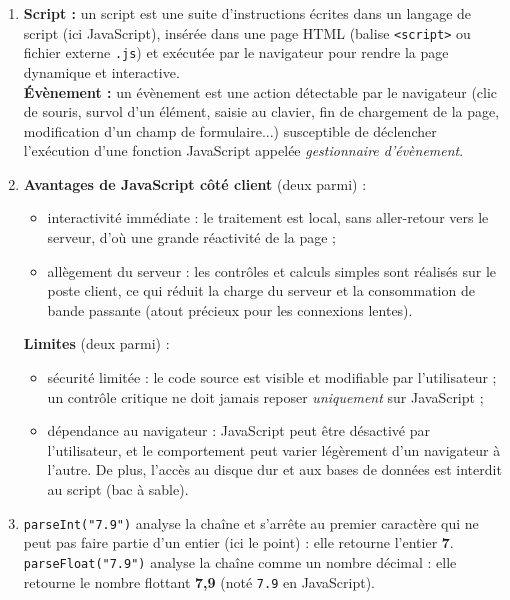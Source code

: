 \documentclass[11pt]{article}
\newcommand{\cle}[1]{{\popxbold\color{popdark}#1}}
\begin{document}
\begin{corrige}
\begin{enumerate}
\item \textbf{Script :} un \cle{script} est une suite d'instructions écrites dans un langage de script (ici JavaScript), insérée dans une page HTML (balise \texttt{<script>} ou fichier externe \texttt{.js}) et exécutée par le navigateur pour rendre la page dynamique et interactive.\\
\textbf{Évènement :} un \cle{évènement} est une action détectable par le navigateur (clic de souris, survol d'un élément, saisie au clavier, fin de chargement de la page, modification d'un champ de formulaire...) susceptible de déclencher l'exécution d'une fonction JavaScript appelée \emph{gestionnaire d'évènement}.
\item \textbf{Avantages de JavaScript côté client} (deux parmi) :
\begin{itemize}
\item interactivité immédiate : le traitement est local, sans aller-retour vers le serveur, d'où une grande réactivité de la page ;
\item allègement du serveur : les contrôles et calculs simples sont réalisés sur le poste client, ce qui réduit la charge du serveur et la consommation de bande passante (atout précieux pour les connexions lentes).
\end{itemize}
\textbf{Limites} (deux parmi) :
\begin{itemize}
\item sécurité limitée : le code source est visible et modifiable par l'utilisateur ; un contrôle critique ne doit jamais reposer \emph{uniquement} sur JavaScript ;
\item dépendance au navigateur : JavaScript peut être désactivé par l'utilisateur, et le comportement peut varier légèrement d'un navigateur à l'autre. De plus, l'accès au disque dur et aux bases de données est interdit au script (bac à sable).
\end{itemize}
\item \texttt{parseInt("7.9")} analyse la chaîne et s'arrête au premier caractère qui ne peut pas faire partie d'un entier (ici le point) : elle retourne l'entier \textbf{7}.\\
\texttt{parseFloat("7.9")} analyse la chaîne comme un nombre décimal : elle retourne le nombre flottant \textbf{7,9} (noté \texttt{7.9} en JavaScript).
\end{enumerate}
\end{corrige}
\end{document}
